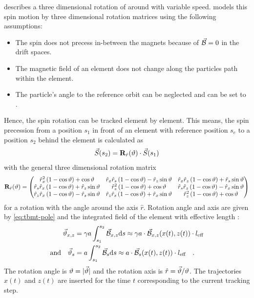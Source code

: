 \documentclass[a4paper]{scrartcl}
\begin{document}
 describes a three dimensional rotation of \svec around \bnvec with variable
speed. \polem models this spin motion by three dimensional rotation matrices using the
following assumptions:
\begin{itemize}
\item The spin does not precess in-between the magnets because of $\bnvec=0$ in the drift
  spaces.
\item The magnetic field of an element does not change along the particles path within the
  element.
\item The particle's angle to the reference orbit can be neglected and \bpara can be set
  to \blong.
\end{itemize}
Hence, the spin rotation can be tracked element by element. This means, the spin
precession from a position $s_1$ in front of an element with reference position $s_e$ to a
position $s_2$ behind the element is calculated as
\begin{equation}
  \label{eq:matrixtracking}
  \svec(s_2) = \mathbf{R}_{\hat{r}}(\sang) \cdot\svec(s_1)
\end{equation}
with the general three dimensional rotation matrix
\begin{equation*}
  \mathbf{R}_{\hat{r}}(\sang) = 
  \begin{pmatrix}
    \hat{r}_x^2\left(1-\cos \sang \right)+\cos \sang &\hat{r}_x\hat{r}_s\left(1-\cos \sang
    \right)-\hat{r}_z\sin \sang &\hat{r}_x\hat{r}_z\left(1-\cos \sang \right)+\hat{r}_s\sin
    \sang \\
    \hat{r}_s\hat{r}_x\left(1-\cos \sang \right)+\hat{r}_z\sin \sang &\hat{r}_s^2\left(1-\cos \sang
    \right)+\cos \sang &\hat{r}_s\hat{r}_z\left(1-\cos \sang \right)-\hat{r}_x\sin \sang \\
    \hat{r}_z\hat{r}_x\left(1-\cos \sang \right)-\hat{r}_s\sin \sang &\hat{r}_z\hat{r}_s\left(1-\cos \sang
    \right)+\hat{r}_x \sin \sang &\hat{r}_z^{2}\left(1-\cos \sang \right)+\cos \sang
  \end{pmatrix}
\end{equation*}
for a rotation with the angle \sang around the axis $\hat{r}$. Rotation angle and axis are
given by \cref{eq:tbmt-pole} and the integrated field of the element with effective length
\leff:
\begin{align*}
  \vec\sang_{x,z} &= \ga \int_{s_1}^{s_2} \bnvec[x,z] \dif s \approx \ga\cdot \bnvec[x,z](x(t),z(t)) \cdot\leff\\
  \text{and}\quad \vec\sang_{s} &= a \int_{s_1}^{s_2} \bnvec[s] \dif s \approx a\cdot \bnvec[s](x(t),z(t)) \cdot\leff
  \quad.
\end{align*}
The rotation angle is $\sang = |\vec\sang|$ and the rotation axis
is $\hat{r} = \vec\sang / \sang$.
%
The trajectories $x(t)$ and $z(t)$ are inserted for the time $t$ corresponding to the
current tracking step.
\end{document}
